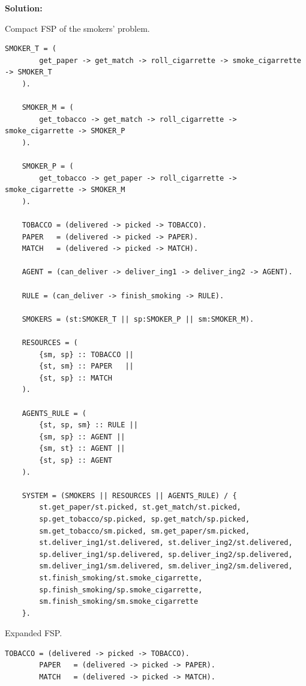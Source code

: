 \documentclass{article}
\makeatletter
\newenvironment{solution}{
	\vspace{0.4cm}\par\noindent\large\textbf{{Solution:}}\par\vspace{1em}
}{\vspace{0.1em}}
\newcounter{currentstep}
\renewcommand{\thecurrentstep}{\Roman{currentstep}}
\newenvironment{steps}{
	\let\steps@olditem\item
	\begin{list}{}{
		\setlength\leftmargin{3.15em}
		\setlength\itemsep{0.4em}
		\setlength\topsep{0.8em}
	}
	\renewcommand{\item}{
		\stepcounter{currentstep}
		\steps@olditem[\textbf{(\thecurrentstep)}]
	}
}{
	\end{list}
	\let\item\steps@olditem
}
\makeatother
\begin{document}
\begin{solution}
	\begin{steps}
		\item Compact FSP of the smokers' problem.
	\end{steps}
	\begin{lstlisting}[language={}, caption={Compact FSP specification of smokers' problem}, label={lst:smokers2}]
	SMOKER_T = (
	    get_paper -> get_match -> roll_cigarrette -> smoke_cigarrette -> SMOKER_T
	).
	
	SMOKER_M = (
	    get_tobacco -> get_match -> roll_cigarrette -> smoke_cigarrette -> SMOKER_P
	).
	
	SMOKER_P = (
	    get_tobacco -> get_paper -> roll_cigarrette -> smoke_cigarrette -> SMOKER_M
	).
	
	TOBACCO = (delivered -> picked -> TOBACCO).
	PAPER   = (delivered -> picked -> PAPER).
	MATCH   = (delivered -> picked -> MATCH).
	
	AGENT = (can_deliver -> deliver_ing1 -> deliver_ing2 -> AGENT).
	
	RULE = (can_deliver -> finish_smoking -> RULE).
	
	SMOKERS = (st:SMOKER_T || sp:SMOKER_P || sm:SMOKER_M).
	
	RESOURCES = (
	    {sm, sp} :: TOBACCO ||
	    {st, sm} :: PAPER   ||
	    {st, sp} :: MATCH
	).
	
	AGENTS_RULE = (
	    {st, sp, sm} :: RULE ||
	    {sm, sp} :: AGENT ||
	    {sm, st} :: AGENT ||
	    {st, sp} :: AGENT
	).
	
	SYSTEM = (SMOKERS || RESOURCES || AGENTS_RULE) / {
	    st.get_paper/st.picked, st.get_match/st.picked,
	    sp.get_tobacco/sp.picked, sp.get_match/sp.picked,
	    sm.get_tobacco/sm.picked, sm.get_paper/sm.picked,
	    st.deliver_ing1/st.delivered, st.deliver_ing2/st.delivered,
	    sp.deliver_ing1/sp.delivered, sp.deliver_ing2/sp.delivered,
	    sm.deliver_ing1/sm.delivered, sm.deliver_ing2/sm.delivered,
	    st.finish_smoking/st.smoke_cigarrette,
	    sp.finish_smoking/sp.smoke_cigarrette,
	    sm.finish_smoking/sm.smoke_cigarrette
	}.
	\end{lstlisting}

	\begin{steps}
		\item Expanded FSP.
	\end{steps}

	\begin{lstlisting}[language={}, caption={Expanded FSP specification of smokers' problem}, label={lst:smokers1}]
		TOBACCO = (delivered -> picked -> TOBACCO).
		PAPER   = (delivered -> picked -> PAPER).
		MATCH   = (delivered -> picked -> MATCH).
		

\end{lstlisting}
\end{solution}
\end{document}
